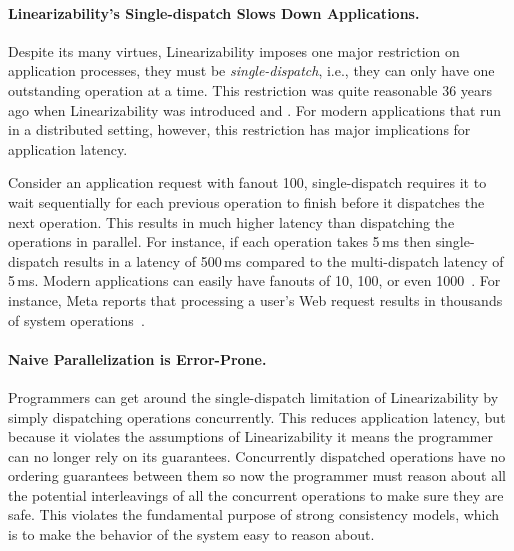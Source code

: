 \paragraph{Linearizability's Single-dispatch Slows Down Applications.}
Despite its many virtues, Linearizability imposes one major restriction on application processes, they must be \textit{single-dispatch}, i.e., they can only have one outstanding operation at a time. 
This restriction was quite reasonable 36 years ago when Linearizability was introduced and . For modern applications that run in a distributed setting, however, this restriction has major implications for application latency.


Consider an application request with fanout 100, single-dispatch requires it to wait sequentially for each previous operation to finish before it dispatches the next operation. This results in much higher latency than dispatching the operations in parallel. For instance, if each operation takes 5\,ms then single-dispatch results in a latency of 500\,ms compared to the multi-dispatch latency of 5\,ms.
Modern applications can easily have fanouts of 10, 100, or even 1000~\cite{dean2013tail}. For instance, Meta reports that processing a user's Web request results in thousands of system operations~\cite{ajoux2015challenges}.



\paragraph{Naive Parallelization is Error-Prone.}
Programmers can get around the single-dispatch limitation of Linearizability by simply dispatching operations concurrently.
This reduces application latency, but because it violates the assumptions of Linearizability it means the programmer can no longer rely on its guarantees. Concurrently dispatched operations have no ordering guarantees between them so now the programmer must reason about all the potential interleavings of all the concurrent operations to make sure they are safe. This violates the fundamental purpose of strong consistency models, which is to make the behavior of the system easy to reason about.


